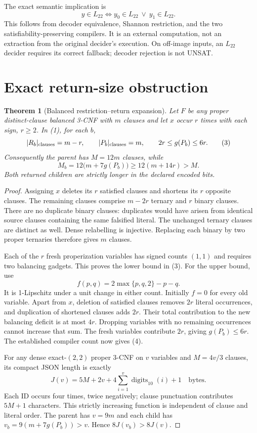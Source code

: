 \documentclass[11pt]{article}
\newtheorem{theorem}{Theorem}
\begin{document}
The exact semantic implication is
\[
 y\in L_{22}\iff y_0\in L_{22}\ \lor\ y_1\in L_{22}.        \tag{2}
\]
This follows from decoder equivalence, Shannon restriction, and the two
satisfiability-preserving compilers. It is an external computation, not an
extraction from the original decider's execution. On off-image inputs, an
$L_{22}$ decider requires its correct fallback; decoder rejection is not UNSAT.

\section{Exact return-size obstruction}
\begin{theorem}[Balanced restriction--return expansion]\label{thm:return}
Let $F$ be any proper distinct-clause balanced 3-CNF with $m$ clauses and let
$x$ occur $r$ times with each sign, $r\ge2$. In (1), for each $b$,
\[
 |R_b|_{\rm clauses}=m-r,\qquad |P_b|_{\rm clauses}=m,
 \qquad 2r\le g(P_b)\le6r.                              \tag{3}
\]
Consequently the parent has $M=12m$ clauses, while
\[
 M_b=12\bigl(m+7g(P_b)\bigr)\ge12(m+14r)>M.              \tag{4}
\]
Both returned children are strictly longer in the declared encoded bits.
\end{theorem}
\begin{proof}
Assigning $x$ deletes its $r$ satisfied clauses and shortens its $r$ opposite
clauses. The remaining clauses comprise $m-2r$ ternary and $r$ binary clauses.
There are no duplicate binary clauses: duplicates would have arisen from
identical source clauses containing the same falsified literal. The unchanged
ternary clauses are distinct as well. Dense relabelling is injective.
Replacing each binary by two proper ternaries therefore gives $m$ clauses.

Each of the $r$ fresh properization variables has signed counts $(1,1)$ and
requires two balancing gadgets. This proves the lower bound in (3). For the
upper bound, use
\[
 f(p,q)=2\max\{p,q,2\}-p-q.
\]
It is 1-Lipschitz under a unit change in either count. Initially $f=0$ for
every old variable. Apart from $x$, deletion of satisfied clauses removes
$2r$ literal occurrences, and duplication of shortened clauses adds $2r$.
Their total contribution to the new balancing deficit is at most $4r$.
Dropping variables with no remaining occurrences cannot increase that sum.
The fresh variables contribute $2r$, giving $g(P_b)\le6r$.
The established compiler count now gives (4).

For any dense exact-$(2,2)$ proper 3-CNF on $v$ variables and $M=4v/3$
clauses, its compact JSON length is exactly
\[
 J(v)=5M+2v+4\sum_{i=1}^{v}\operatorname{digits}_{10}(i)+1
 \quad\text{bytes}.                                      \tag{5}
\]
Each ID occurs four times, twice negatively; clause punctuation contributes
$5M+1$ characters. This strictly increasing function is independent of clause
and literal order. The parent has $v=9m$ and each child has
$v_b=9(m+7g(P_b))>v$. Hence $8J(v_b)>8J(v)$.
\end{proof}
\end{document}

